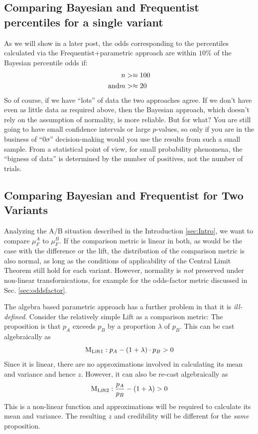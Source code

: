 \documentclass[12pt]{report}
\newcommand{\beq}{\begin{equation}} %
\newcommand{\eeq}{\end{equation}} %
\newcommand{\bdm}{\begin{displaymath}} %
\newcommand{\edm}{\end{displaymath}} %
\begin{document}
\subsection{Comparing Bayesian and Frequentist percentiles for a single variant}
As we will show in a later post, the odds corresponding to
the percentiles calculated via the Frequentist+parametric approach
are within \(10\%\) of the Bayesian percentile odds if:
\beq
\begin{split}
  n &>\approx 100\\
 {\rm and } m &>\approx 20
\end{split}
\eeq
So of course, if we have ``lots'' of data the two approaches agree.
If we don't have even as
little data as required above, then the Bayesian approach,
which doesn't rely on the assumption of normality, is more reliable. But for
what? You are still going to have small confidence intervals or large
\(p\)-values, so only if you are in the business of ``0\(\sigma\)''
decision-making would you use the results from such a small sample. From a
statistical point of view, for small probability phenomena, the ``bigness of
data'' is determined by the number of positives, not the number of trials.

\subsection{Comparing Bayesian and Frequentist for Two Variants}
Analyzing the A/B situation described in the Introduction
\ref{sec:Intro}, we want to compare \(\mu^A_F\) to \(\mu^B_F\). If the
comparison metric is linear in both, as would be the case with the difference
or the lift, the distribution of the comparison metric is also normal, as long
as the conditions of applicability of the Central Limit Theorem still hold for
each variant. However, normality is {\em not} preserved under non-linear
transfornications, for example for the odds-factor metric discussed in
Sec. \ref{sec:oddsfactor}. 

The algebra based parametric approach has a further
problem in that it is {\em ill-defined}.
Consider the relatively simple Lift as a
comparison metric: The proposition is that \(p_A\) exceeds \(p_B\) by a
proportion \(\lambda\) of \(p_B\). This can be cast algebraically as
\bdm
{\rm M_{Lift1} }: p_A - (1+\lambda)\cdot p_B > 0
\edm
Since it is linear, there are no approximations involved in calculating
its mean and variance and hence \(z\). However, it can also be re-cast
algebraically as
\bdm
{\rm M_{Lift2} }: \frac{p_A}{p_B} - (1+\lambda) > 0
\edm
This is a non-linear function and approximations will be required to calculate
its mean and variance. The resulting \(z\) and credibility
will be different for the {\em same} proposition.
\end{document}
